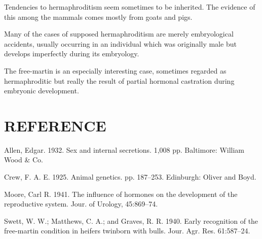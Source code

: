 Tendencies to hermaphroditism seem sometimes to be inherited.
The evidence of this among the mammals comes mostly from goats and
pigs.

Many of the cases of supposed hermaphroditism are merely embryological
accidents, usually occurring in an individual which was originally
male but develops imperfectly during its embryology.

The free-martin is an especially interesting case, sometimes regarded
as hermaphroditic but really the result of partial hormonal castration
during embryonic development.

\section*{REFERENCE}

\begin{hangparas}{0.5in}{1}%
Allen, Edgar. 1932. Sex and internal secretions. 1,008 pp. Baltimore: William Wood
\& Co.

Crew, F. A. E. 1925. Animal genetics. pp. 187--253. Edinburgh: Oliver and Boyd.

Moore, Carl R. 1941. The influence of hormones on the development of the reproductive
system. Jour. of Urology, 45:869--74.

Swett, W. W.; Matthews, C. A.; and Graves, R. R. 1940. Early recognition of the
free-martin condition in heifers twinborn with bulls. Jour. Agr. Res.
61:587--24.
\end{hangparas}